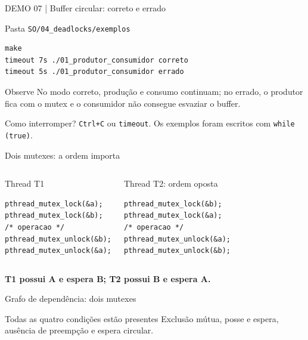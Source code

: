 \documentclass[aspectratio=169,11pt]{beamer}
\begin{document}
\begin{frame}[fragile]{DEMO 07 | Buffer circular: correto e errado}
\small
\begin{block}{Pasta \texttt{SO/04\_deadlocks/exemplos}}
\begin{verbatim}
make
timeout 7s ./01_produtor_consumidor correto
timeout 5s ./01_produtor_consumidor errado
\end{verbatim}
\end{block}
\begin{exampleblock}{Observe}
No modo correto, produção e consumo continuam; no errado, o produtor fica com o mutex e o consumidor não consegue esvaziar o buffer.
\end{exampleblock}
\begin{alertblock}{Como interromper?}
\texttt{Ctrl+C} ou \texttt{timeout}. Os exemplos foram escritos com \texttt{while (true)}.
\end{alertblock}
\end{frame}

\begin{frame}[fragile]{Dois mutexes: a ordem importa}
\small
\begin{columns}[T,onlytextwidth]
\begin{block}{Thread T1}
\begin{verbatim}
pthread_mutex_lock(&a);
pthread_mutex_lock(&b);
/* operacao */
pthread_mutex_unlock(&b);
pthread_mutex_unlock(&a);
\end{verbatim}
\end{block}
\begin{alertblock}{Thread T2: ordem oposta}
\begin{verbatim}
pthread_mutex_lock(&b);
pthread_mutex_lock(&a);
/* operacao */
pthread_mutex_unlock(&a);
pthread_mutex_unlock(&b);
\end{verbatim}
\end{alertblock}
\end{columns}
\vspace{.35cm}
\centering\textbf{T1 possui A e espera B; T2 possui B e espera A.}
\end{frame}

\begin{frame}{Grafo de dependência: dois mutexes}
\small
\centering
{}
\vspace{1cm}
\begin{block}{Todas as quatro condições estão presentes}
Exclusão mútua, posse e espera, ausência de preempção e espera circular.
\end{block}
\end{frame}
\end{document}
